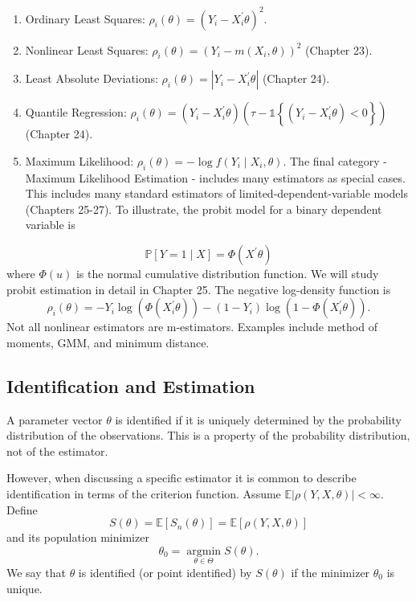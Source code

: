 \documentclass[10pt]{article}
\begin{document}
\begin{enumerate}
  \item Ordinary Least Squares: $\rho_{i}(\theta)=\left(Y_{i}-X_{i}^{\prime} \theta\right)^{2}$.

  \item Nonlinear Least Squares: $\rho_{i}(\theta)=\left(Y_{i}-m\left(X_{i}, \theta\right)\right)^{2}$ (Chapter 23).

  \item Least Absolute Deviations: $\rho_{i}(\theta)=\left|Y_{i}-X_{i}^{\prime} \theta\right|$ (Chapter 24).

  \item Quantile Regression: $\rho_{i}(\theta)=\left(Y_{i}-X_{i}^{\prime} \theta\right)\left(\tau-\mathbb{1}\left\{\left(Y_{i}-X_{i}^{\prime} \theta\right)<0\right\}\right)$ (Chapter 24).

  \item Maximum Likelihood: $\rho_{i}(\theta)=-\log f\left(Y_{i} \mid X_{i}, \theta\right)$. The final category - Maximum Likelihood Estimation - includes many estimators as special cases. This includes many standard estimators of limited-dependent-variable models (Chapters 25-27). To illustrate, the probit model for a binary dependent variable is

\end{enumerate}
$$
\mathbb{P}[Y=1 \mid X]=\Phi\left(X^{\prime} \theta\right)
$$
where $\Phi(u)$ is the normal cumulative distribution function. We will study probit estimation in detail in Chapter 25. The negative log-density function is
$$
\rho_{i}(\theta)=-Y_{i} \log \left(\Phi\left(X_{i}^{\prime} \theta\right)\right)-\left(1-Y_{i}\right) \log \left(1-\Phi\left(X_{i}^{\prime} \theta\right)\right) .
$$
Not all nonlinear estimators are m-estimators. Examples include method of moments, GMM, and minimum distance.

\subsection{Identification and Estimation}
A parameter vector $\theta$ is identified if it is uniquely determined by the probability distribution of the observations. This is a property of the probability distribution, not of the estimator.

However, when discussing a specific estimator it is common to describe identification in terms of the criterion function. Assume $\mathbb{E}|\rho(Y, X, \theta)|<\infty$. Define
$$
S(\theta)=\mathbb{E}\left[S_{n}(\theta)\right]=\mathbb{E}[\rho(Y, X, \theta)]
$$
and its population minimizer
$$
\theta_{0}=\underset{\theta \in \Theta}{\operatorname{argmin}} S(\theta) .
$$
We say that $\theta$ is identified (or point identified) by $S(\theta)$ if the minimizer $\theta_{0}$ is unique.
\end{document}
